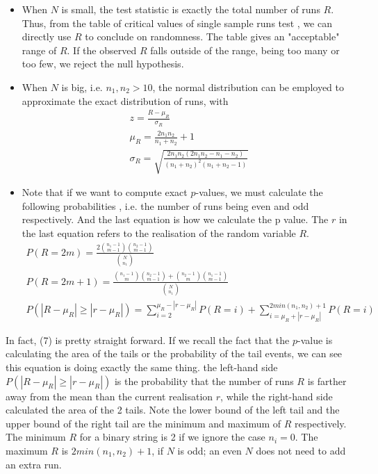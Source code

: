 \documentclass[12pt]{article}
\theoremstyle{plain}
\theoremstyle{definition}
\theoremstyle{remark}
\begin{document}
\begin{itemize}
    \item When $N$ is small, the test statistic is exactly the total number of runs $R$. Thus, from the table of critical values of single sample runs test \cite[Table~A8]{3.4}, we can directly use $R$ to conclude on randomness. The table gives an "acceptable" range of $R$. If the observed $R$ falls outside of the range, being too many or too few, we reject the null hypothesis.
    \item When $N$ is big, i.e. $n_1,n_2>10$, the normal distribution can be employed to approximate the exact
    distribution of runs\cite{3.4}\cite{3.1}\cite{3.3}, with
    \begin{gather*}
      z=\frac{R-\mu_R}{\sigma_R}\\
      \mu_R=\frac{2n_1n_2}{n_1+n_2}+1\\
      \sigma_R=\sqrt{\frac{2n_1n_2(2n_1n_2-n_1-n_2)}{(n_1+n_2)^2(n_1+n_2-1)}}
    \end{gather*}
    \item Note that if we want to compute exact $p$-values, we must calculate the following probabilities \cite{3.3}\cite{3.6}, i.e. the number of runs being even and odd respectively. And the last equation is how we calculate the p value. The $r$ in the last equation refers to the realisation of the random variable $R$.
    \begin{gather}
      P(R=2m)=\frac{2\binom{n_1-1}{m-1}\binom{n_2-1}{m-1}}{\binom{N}{n_1}}\\
      P(R=2m+1)=\frac{\binom{n_1-1
      }{m}\binom{n_2-1}{m-1}+\binom{n_2-1}{m} \binom{n_1-1}{m-1}}{\binom{N}{n_1}}\\
      P(|R-\mu_R|\ge|r-\mu_R|)=\sum_{i=2}^{\mu_R-|r-\mu_R|}P(R=i)+\sum_{i=\mu_R+|r-\mu_R|}^{2min(n_1,n_2)+1}P(R=i)
    \end{gather}
\end{itemize}

In fact, (7) is pretty straight forward. If we recall the fact that the $p$-value is calculating the area of the tails or the probability of the tail events, we can see this equation is doing exactly the same thing. the left-hand side $P(|R-\mu_R|\ge|r-\mu_R|)$ is the probability that the number of runs $R$ is farther away from the mean than the current realisation $r$, while the right-hand side calculated the area of the 2 tails. Note the lower bound of the left tail and the upper bound of the right tail are the minimum and maximum of $R$ respectively. The minimum $R$ for a binary string is 2 if we ignore the case $n_i=0$. The maximum $R$ is $2min(n_1,n_2)+1$, if $N$ is odd; an even $N$ does not need to add an extra run. 
\end{document}
